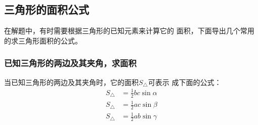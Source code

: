 \subsection{三角形的面积公式}
在解题中，有时需要根据三角形的已知元素来计算它的
面积，下面导出几个常用的求三角形面积的公式。

\subsubsection{已知三角形的两边及其夹角，求面积}

当已知三角形的两边及其夹角时，它的面积$S_{\triangle}$可表示
成下面的公式：
\[\begin{split}
    S_{\triangle}&=\frac{1}{2} bc\sin\alpha\\
S_{\triangle}&=\frac{1}{2} ac\sin\beta\\
S_{\triangle}&=\frac{1}{2}ab\sin\gamma\\
\end{split}\]

